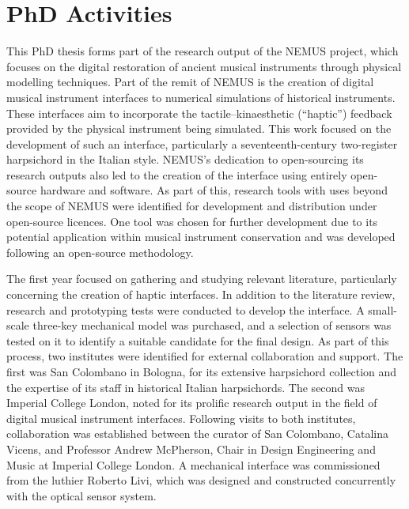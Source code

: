 \section*{\centering PhD Activities}

This PhD thesis forms part of the research output of the NEMUS project, which focuses on the digital restoration of ancient musical instruments through physical modelling techniques. Part of the remit of NEMUS is the creation of digital musical instrument interfaces to numerical simulations of historical instruments. These interfaces aim to incorporate the tactile–kinaesthetic (``haptic'') feedback provided by the physical instrument being simulated. This work focused on the development of such an interface, particularly a seventeenth-century two-register harpsichord in the Italian style. NEMUS's dedication to open-sourcing its research outputs also led to the creation of the interface using entirely open-source hardware and software. As part of this, research tools with uses beyond the scope of NEMUS were identified for development and distribution under open-source licences. One tool was chosen for further development due to its potential application within musical instrument conservation and was developed following an open-source methodology.

The first year focused on gathering and studying relevant literature, particularly concerning the creation of haptic interfaces. In addition to the literature review, research and prototyping tests were conducted to develop the interface. A small-scale three-key mechanical model was purchased, and a selection of sensors was tested on it to identify a suitable candidate for the final design. As part of this process, two institutes were identified for external collaboration and support. The first was San Colombano in Bologna, for its extensive harpsichord collection and the expertise of its staff in historical Italian harpsichords. The second was Imperial College London, noted for its prolific research output in the field of digital musical instrument interfaces. Following visits to both institutes, collaboration was established between the curator of San Colombano, Catalina Vicens, and Professor Andrew McPherson, Chair in Design Engineering and Music at Imperial College London. A mechanical interface was commissioned from the luthier Roberto Livi, which was designed and constructed concurrently with the optical sensor system.

